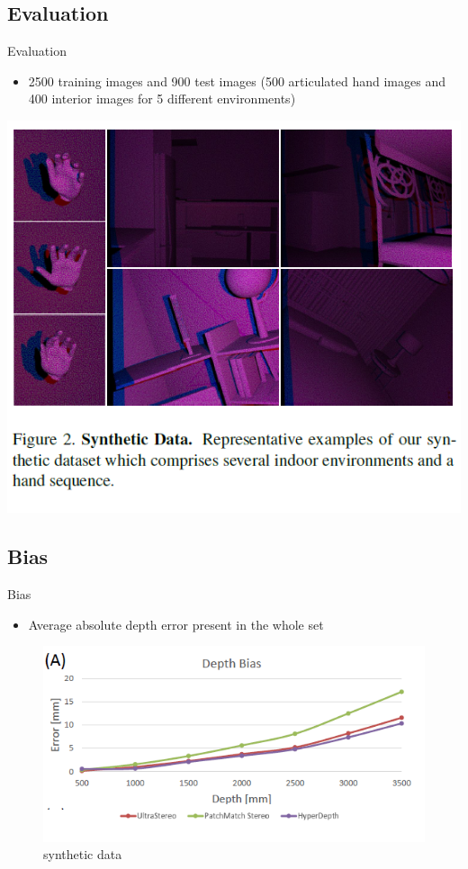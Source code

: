 \subsection{Evaluation}
\begin{frame}{Evaluation}
\begin{itemize}
\item 2500 training images and 900 test images (500 articulated hand images and 400 interior images for 5 different environments)
\end{itemize}
\centering
\includegraphics[scale=0.7]{pictures/fig2_synthetic_data}
\end{frame}

\subsection{Bias}
\begin{frame}{Bias}
\begin{itemize}
\item Average absolute depth error present in the whole set
\end{itemize}
\begin{figure}
\centering
\includegraphics[scale=1]{pictures/fig3_depth_Bias_synthetic_data}
\caption{synthetic data}
\end{figure}
\end{frame}
